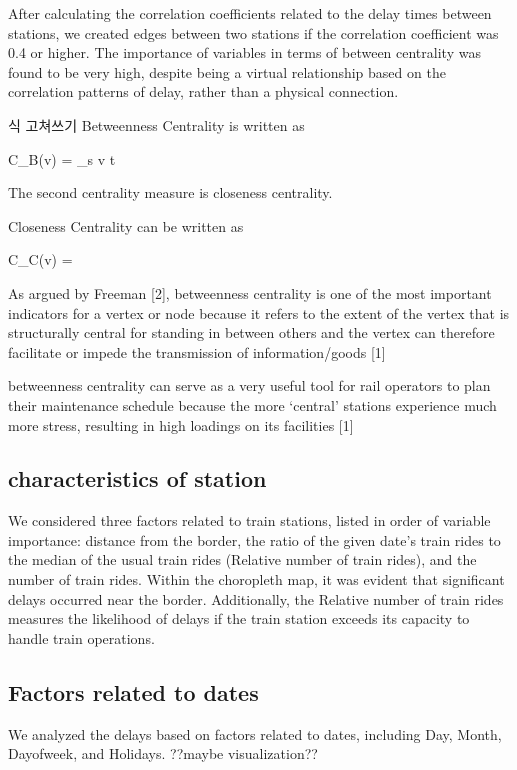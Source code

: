 \documentclass{article}
\theoremstyle{plain}
\theoremstyle{definition}
\theoremstyle{remark}
\begin{document}
After calculating the correlation coefficients related to the delay times between stations, we created edges between two stations if the correlation coefficient was 0.4 or higher. The importance of variables in terms of between centrality was found to be very high, despite being a virtual relationship based on the correlation patterns of delay, rather than a physical connection. 

식 고쳐쓰기 
Betweenness Centrality is written as 

C_B(v) = \sum_{s \neq v \neq t} 

The second centrality measure is closeness centrality. 

Closeness Centrality  can be written as 

C_C(v) = 



As argued by Freeman [2], betweenness centrality is one of the most important indicators for a vertex or node because it refers to the extent of the vertex that is structurally central for standing in between others and the vertex can therefore facilitate or impede the transmission of information/goods [1]

betweenness centrality can serve as a very useful tool for rail operators to plan their maintenance schedule because the more ‘central’ stations experience much more stress, resulting in high loadings on its facilities [1]

\subsection{{characteristics of station}}

We considered three factors related to train stations, listed in order of variable importance: distance from the border, the ratio of the given date's train rides to the median of the usual train rides (Relative number of train rides), and the number of train rides. Within the choropleth map, it was evident that significant delays occurred near the border. Additionally, the Relative number of train rides measures the likelihood of delays if the train station exceeds its capacity to handle train operations.

\subsection{{Factors related to dates}}

We analyzed the delays based on factors related to dates, including Day, Month, Dayofweek, and Holidays.
??maybe visualization??
\end{document}
